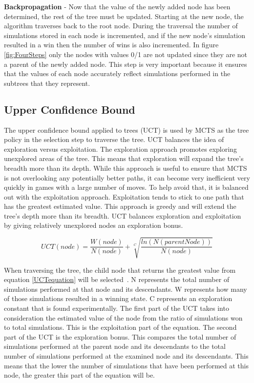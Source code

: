 \documentclass{sig-alternate}
\begin{document}
\textbf{Backpropagation} - Now that the value of the newly added node has been determined, the rest of the tree must be updated. Starting at the new node, the algorithm traverses back to the root node. During the traversal the number of simulations stored in each node is incremented, and if the new node's simulation resulted in a win then the number of wins is also incremented. In figure \ref{fig:FourSteps} only the nodes with values 0/1 are not updated since they are not a parent of the newly added node. This step is very important because it ensures that the values of each node accurately reflect simulations performed in the subtrees that they represent.

\subsection{Upper Confidence Bound}

The upper confidence bound applied to trees (UCT) is used by MCTS as the tree policy in the selection step to traverse the tree. UCT balances the idea of exploration versus exploitation. The exploration approach promotes exploring unexplored areas of the tree. This means that exploration will expand the tree's breadth more than its depth. While this approach is useful to ensure that MCTS is not overlooking any potentially better paths, it can become very inefficient very quickly in games with a large number of moves. To help avoid that, it is balanced out with the exploitation approach. Exploitation tends to stick to one path that has the greatest estimated value. This approach is greedy and will extend the tree's depth more than its breadth. UCT balances exploration and exploitation by giving relatively unexplored nodes an exploration bonus.  

 \begin{equation*}
 \label{UCTequation}
 UCT(node) = \frac{W(node)}{N(node)} + \sqrt[C]{\frac{ln(N(parentNode))}{N(node)}}
 \end{equation*}

When traversing the tree, the child node that returns the greatest value from equation \ref{UCTequation} will be selected~\cite{ActionSelection}. N represents the total number of simulations performed at that node and its descendants. W represents how many of those simulations resulted in a winning state. C represents an exploration constant that is found experimentally. The first part of the UCT takes into consideration the estimated value of the node from the ratio of simulations won to total simulations. This is the exploitation part of the equation. The second part of the UCT is the exploration bonus. This compares the total number of simulations performed at the parent node and its descendants to the total number of simulations performed at the examined node and its descendants. This means that the lower the number of simulations that have been performed at this node, the greater this part of the equation will be. 
\end{document}
